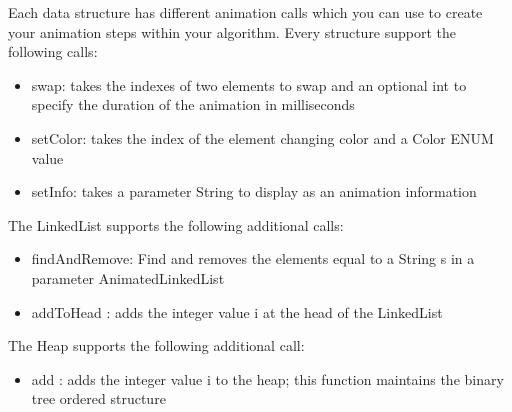 \documentclass{l3proj}
\begin{document}
Each data structure has different animation calls which you can use to create your animation steps within your algorithm.
Every structure support the following calls:
\begin{itemize}
\item swap: takes the indexes of two elements to swap and an optional int to specify the duration of the animation in milliseconds
\item setColor: takes the index of the element changing color and a Color ENUM value
\item setInfo: takes a parameter String to display as an animation information
\end{itemize}

The LinkedList supports the following additional calls:
\begin{itemize}
\item findAndRemove: Find and removes the elements equal to a String s in a parameter AnimatedLinkedList
\item addToHead : adds the integer value i at the head of the LinkedList
\end{itemize}

The Heap supports the following additional call:
\begin{itemize}
\item add : adds the integer value i to the heap; this function maintains the binary tree ordered structure
\end{itemize}
\end{document}
